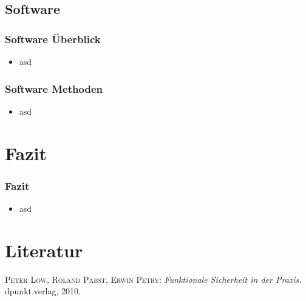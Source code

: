 \documentclass[]{beamer}
\begin{document}
\subsection{Software}

\begin{frame}
\frametitle{Software Überblick}

\begin{itemize}
    \item asd
\end{itemize}

\end{frame}

\begin{frame}
\frametitle{Software Methoden}

\begin{itemize}
    \item asd
\end{itemize}

\end{frame}



\section{Fazit}
\label{sec:Fazit}

\begin{frame}
\frametitle{Fazit}

\begin{itemize}
    \item asd
\end{itemize}

\end{frame}








\appendix
\section*{Literatur}
\label{sec:Literatur}

\begin{frame}
\begin{thebibliography}{10}

 \textsc{Peter Löw, Roland Pabst, Erwin Petry}: {\em Funktionale Sicherheit in der Praxis.} dpunkt.verlag, 2010.

\end{thebibliography}
\end{frame}
\end{document}
